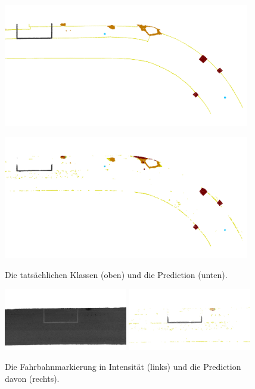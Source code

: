 \begin{figure}
    {\includegraphics[width=0.96\textwidth]{graphics/eval_right_ground_truth}}
    \par\smallskip
    {\includegraphics[width=0.96\textwidth]{graphics/eval_right_prediction}}
    \caption{Die tatsächlichen Klassen (oben) und die Prediction (unten).}
    \label{fig:cmp_full}
\end{figure}

\begin{figure}
    {\includegraphics[width=0.48\textwidth]{graphics/eval_road_marking}}
    {\includegraphics[width=0.48\textwidth]{graphics/eval_road_marking_classes}}
    \caption{Die Fahrbahnmarkierung in Intensität (links) und die Prediction davon (rechts).}
    \label{fig:road_marking}
\end{figure}

